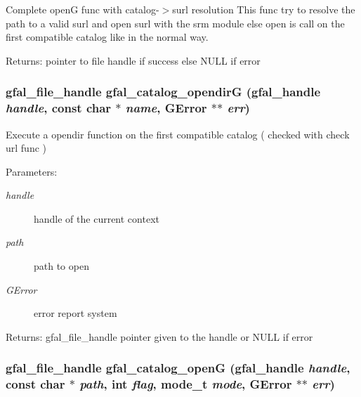 Complete open\-G func with catalog-$>$surl resolution This func try to resolve the path to a valid surl and open surl with the srm module else open is call on the first compatible catalog like in the normal way. \begin{Desc}
\item[Returns:]pointer to file handle if success else NULL if error \end{Desc}
\subsubsection{\setlength{\rightskip}{0pt plus 5cm}gfal\_\-file\_\-handle gfal\_\-catalog\_\-opendir\-G (gfal\_\-handle {\em handle}, const char $\ast$ {\em name}, GError $\ast$$\ast$ {\em err})}\label{gfal__common__catalog_8h_eb89b1d37a16ef8ecb50ac603366285c}


Execute a opendir function on the first compatible catalog ( checked with check url func ) \begin{Desc}
\item[Parameters:]
\begin{description}
\item[{\em handle}]handle of the current context \item[{\em path}]path to open \item[{\em GError}]error report system \end{description}
\end{Desc}
\begin{Desc}
\item[Returns:]gfal\_\-file\_\-handle pointer given to the handle or NULL if error \end{Desc}
\subsubsection{\setlength{\rightskip}{0pt plus 5cm}gfal\_\-file\_\-handle gfal\_\-catalog\_\-open\-G (gfal\_\-handle {\em handle}, const char $\ast$ {\em path}, int {\em flag}, mode\_\-t {\em mode}, GError $\ast$$\ast$ {\em err})}\label{gfal__common__catalog_8h_cd4cabbd5effdf20bc0b20345c5cc4ab}


